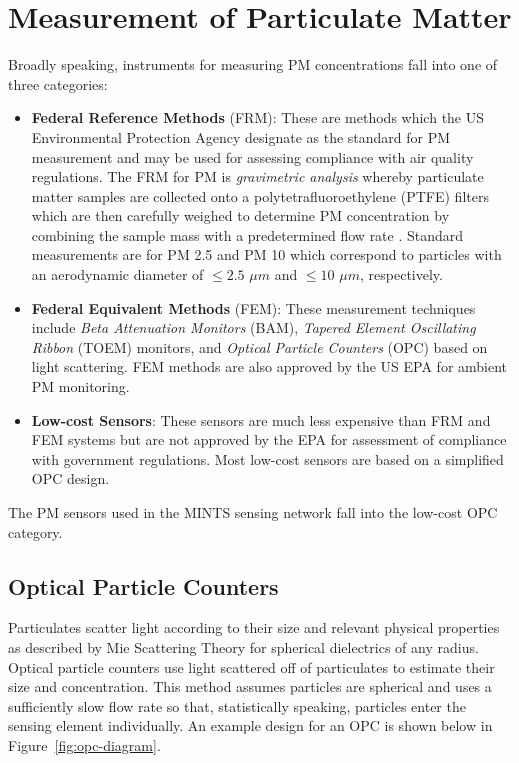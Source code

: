 \section{Measurement of Particulate Matter}

Broadly speaking, instruments for measuring PM concentrations fall into one of
three categories:
\begin{itemize}
  \item \textbf{Federal Reference Methods} (FRM): These are methods which the US
    Environmental Protection Agency designate as the standard for PM measurement
    and may be used for assessing compliance with air quality regulations. The
    FRM for PM is \textit{gravimetric analysis} whereby particulate matter
    samples are collected onto a polytetrafluoroethylene (PTFE) filters which are
    then carefully weighed to determine PM concentration by combining the sample
    mass with a predetermined flow rate \cite{pm-federal-reference-method}. Standard
    measurements are for PM 2.5 and PM 10 which correspond to particles with an
    aerodynamic diameter of $\leq 2.5$ $\mu m$ and $\leq 10$ $\mu m$, respectively.
  \item \textbf{Federal Equivalent Methods} (FEM): These measurement techniques
    include \textit{Beta Attenuation Monitors}  (BAM), \textit{Tapered Element
      Oscillating Ribbon} (TOEM) monitors, and \textit{Optical Particle
      Counters} (OPC) based on light scattering. FEM methods are also approved
    by the US EPA for ambient PM monitoring.
  \item \textbf{Low-cost Sensors}: These sensors are much less expensive than
    FRM and FEM systems but are not approved by the EPA for assessment of
    compliance with government regulations. Most low-cost sensors are based on
    a simplified OPC design.
\end{itemize}
The PM sensors used in the MINTS sensing network fall into the low-cost OPC category.

\subsection{Optical Particle Counters}

Particulates scatter light according to their size and relevant physical
properties as described by Mie Scattering Theory for spherical dielectrics of
any radius. Optical particle
counters use light scattered off of particulates to estimate their size and
concentration. This method assumes particles are spherical and uses a
sufficiently slow flow rate so that, statistically speaking, particles enter the
sensing element individually. An example design for an OPC is shown below in
Figure~\ref{fig:opc-diagram}.

